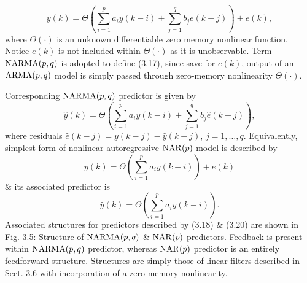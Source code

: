\documentclass{article}
\begin{document}
\begin{enumerate}
\begin{itemize}
\begin{itemize}
			\begin{equation}
				y(k) = \Theta\left(\sum_{i=1}^p a_iy(k - i) + \sum_{j=1}^q b_je(k - j)\right) + e(k),
			\end{equation}
			where $\Theta(\cdot)$ is an unknown differentiable zero memory nonlinear function. Notice $e(k)$ is not included within $\Theta(\cdot)$ as it is unobservable. Term ${\rm NARMA}(p,q)$ is adopted to define (3.17), since save for $e(k)$, output of an ${\rm ARMA}(p,q)$ model is simply passed through zero-memory nonlinearity $\Theta(\cdot)$.
			
			Corresponding ${\rm NARMA}(p,q)$ predictor is given by
			\begin{equation}
				\hat{y}(k) = \Theta\left(\sum_{i=1}^p a_iy(k - i) + \sum_{j=1}^q b_j\hat{e}(k - j)\right),
			\end{equation}
			where residuals $\hat{e}(k - j) = y(k - j) - \hat{y}(k - j)$, $j = 1,\ldots,q$. Equivalently, simplest form of nonlinear autoregressive ${\rm NAR}(p)$ model is described by
			\begin{equation}
				y(k) = \Theta\left(\sum_{i=1}^p a_iy(k - i)\right) + e(k)
			\end{equation}
			\& its associated predictor is
			\begin{equation}
				\hat{y}(k) = \Theta\left(\sum_{i=1}^p a_iy(k - i)\right) .
			\end{equation}
			Associated structures for predictors described by (3.18) \& (3.20) are shown in {\sf Fig. 3.5: Structure of ${\rm NARMA}(p,q)$ \& ${\rm NAR}(p)$ predictors}. Feedback is present within ${\rm NARMA}(p,q)$ predictor, whereas ${\rm NAR}(p)$ predictor is an entirely feedforward structure. Structures are simply those of linear filters described in Sect. 3.6 with incorporation of a zero-memory nonlinearity.
			

\end{itemize}
\end{itemize}
\end{enumerate}
\end{document}
